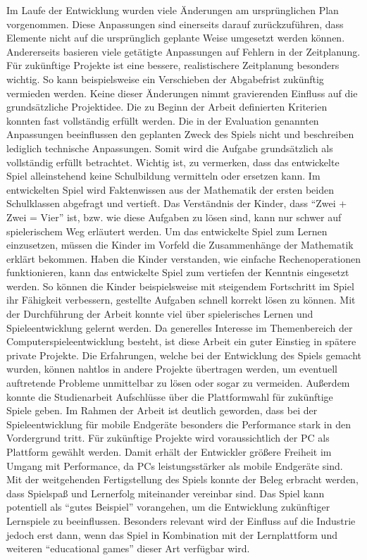 Im Laufe der Entwicklung wurden viele Änderungen am ursprünglichen Plan vorgenommen. Diese Anpassungen sind einerseits darauf zurückzuführen, dass Elemente nicht auf die ursprünglich geplante Weise umgesetzt werden können. Andererseits basieren viele getätigte Anpassungen auf Fehlern in der Zeitplanung. Für zukünftige Projekte ist eine bessere, realistischere Zeitplanung besonders wichtig. So kann beispielsweise ein Verschieben der Abgabefrist zukünftig vermieden werden.
Keine dieser Änderungen nimmt gravierenden Einfluss auf die grundsätzliche Projektidee. Die zu Beginn der Arbeit definierten Kriterien konnten fast vollständig erfüllt werden. Die in der Evaluation genannten Anpassungen beeinflussen den geplanten Zweck des Spiels nicht und beschreiben lediglich technische Anpassungen. Somit wird die Aufgabe grundsätzlich als vollständig erfüllt betrachtet.
Wichtig ist, zu vermerken, dass das entwickelte Spiel alleinstehend keine Schulbildung vermitteln oder ersetzen kann. Im entwickelten Spiel wird Faktenwissen aus der Mathematik der ersten beiden Schulklassen abgefragt und vertieft. Das Verständnis der Kinder, dass \enquote{Zwei + Zwei = Vier} ist, bzw. wie diese Aufgaben zu lösen sind, kann nur schwer auf spielerischem Weg erläutert werden. Um das entwickelte Spiel zum Lernen einzusetzen, müssen die Kinder im Vorfeld die Zusammenhänge der Mathematik erklärt bekommen. Haben die Kinder verstanden, wie einfache Rechenoperationen funktionieren, kann das entwickelte Spiel zum vertiefen der Kenntnis eingesetzt werden. So können die Kinder beispielsweise mit steigendem Fortschritt im Spiel ihr Fähigkeit verbessern, gestellte Aufgaben schnell korrekt lösen zu können.
Mit der Durchführung der Arbeit konnte viel über spielerisches Lernen und Spieleentwicklung gelernt werden. Da generelles Interesse im Themenbereich der Computerspieleentwicklung besteht, ist diese Arbeit ein guter Einstieg in spätere private Projekte. Die Erfahrungen, welche bei der Entwicklung des Spiels gemacht wurden, können nahtlos in andere Projekte übertragen werden, um eventuell auftretende Probleme unmittelbar zu lösen oder sogar zu vermeiden. Außerdem konnte die Studienarbeit Aufschlüsse über die Plattformwahl für zukünftige Spiele geben. Im Rahmen der Arbeit ist deutlich geworden, dass bei der Spieleentwicklung für mobile Endgeräte besonders die Performance stark in den Vordergrund tritt. Für zukünftige Projekte wird voraussichtlich der PC als Plattform gewählt werden. Damit erhält der Entwickler größere Freiheit im Umgang mit Performance, da PCs leistungsstärker als mobile Endgeräte sind.
Mit der weitgehenden Fertigstellung des Spiels konnte der Beleg erbracht werden, dass Spielspaß und Lernerfolg miteinander vereinbar sind. Das Spiel kann potentiell als \enquote{gutes Beispiel} vorangehen, um die Entwicklung zukünftiger Lernspiele zu beeinflussen. Besonders relevant wird der Einfluss auf die Industrie jedoch erst dann, wenn das Spiel in Kombination mit der Lernplattform und weiteren \enquote{educational games} dieser Art verfügbar wird.


